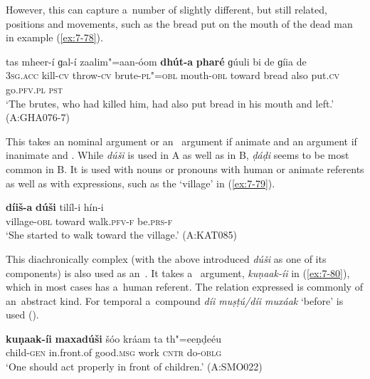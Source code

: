 \begin{exe}
However, this  can capture a~number of slightly different, but still related, positions and movements, such as the bread put on the mouth of the dead man in example (\ref{ex:7-78}). 

\ea
\label{ex:7-78}
\gll tas mheer-í ɡal-í zaalim"=aan-óom \textbf{dhút-a} \textbf{pharé} ɡúuli bi de ɡíia de \\
\textsc{3sg.acc} kill-\textsc{cv} throw-\textsc{cv} brute-\textsc{pl"=obl} mouth-\textsc{obl} toward bread also put.\textsc{cv} go.\textsc{pfv.pl} \textsc{pst} \\
\glt `The brutes, who had killed him, had also put bread in his mouth and left.' (A:GHA076-7)
\z

 This  takes an  nominal argument or an~  argument if animate and an  argument if inanimate and . While \textit{dúši} is used in A as well as in B, \textit{ḍáḍi} seems to be most common in B. It is used with nouns or pronouns with human or animate referents as well as with  expressions, such as the `village' in (\ref{ex:7-79}). 

\begin{exe}
\ex
\label{ex:7-79}
\gll \textbf{díiš-a} \textbf{dúši} tilíl-i hín-i \\
village-\textsc{obl} toward walk.\textsc{pfv-f} be.\textsc{prs-f} \\
\glt `She started to walk toward the village.' (A:KAT085)
\end{exe}

 This diachronically complex  (with the above introduced \textit{dúši} as one of its components) is also used as an~. It takes a~ argument, \textit{kuṇaak-íi} in (\ref{ex:7-80}), which in most cases has a~human referent. The relation expressed is commonly of an~abstract kind. For temporal  a~compound  \textit{díi muṣṭú/díi muxáak} `before' is used ().

\begin{exe}
\ex
\label{ex:7-80}
\gll \textbf{kuṇaak-íi} \textbf{maxadúši} šóo kráam ta th"=eeṇḍeéu \\
child-\textsc{gen}  in.front.of good.\textsc{msg} work \textsc{cntr} do-\textsc{oblg} \\
\glt `One should act properly in front of children.' (A:SMO022)
\end{exe}



\end{exe}
